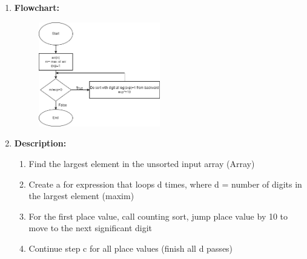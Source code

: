 \documentclass[11pt,a4paper]{article}
\begin{document}
{\begin{enumerate}[label=\textbf{\arabic*})]
\begin{algorithm}
\begin{algorithmic}[1]
            			\State \textcolor{Gray}{//Now main array a[] contains sorted numbers}
            			\State \textcolor{Gray}{//according to current digit place}
            				\State a[i] = result[i]
            			\EndFor
            		\EndFor
            		\EndProcedure
            	\end{algorithmic}
            \end{algorithm}
				\item \textbf{Flowchart:}
					\begin{figure}[H]
						\centering 
						\includegraphics[width=0.5\textwidth]{RadixSort Flowchart}
					\end{figure}
					
				\item \textbf{Description:}
					\begin{enumerate}
					\item Find the largest element in the unsorted input array (Array)
					\item Create a for expression that loops d times, where d = number of digits in the largest element (maxim)
					\item For the first place value, call counting sort, jump place value by 10 to move to the next significant digit
					\item Continue step c for all place values (finish all d passes)
					\end{enumerate}
				

\end{enumerate}}
\end{document}
